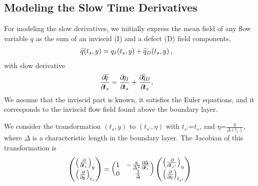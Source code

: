 {%
\subsection{Modeling the Slow Time Derivatives}

For modeling the slow derivatives, we initially express the mean field of any
flow variable $q$ as the sum of an inviscid (I) and a defect (D) field
components,
%
\begin{align}
\label{eqn:similarDecomposition}
\widetilde{q} \! \left(t_s, y\right) &=
     q_I \! \left(t_s, y\right)
   + \widetilde{q}_D \! \left(t_s, y\right)
   ,
\end{align}
%
with slow derivative
\begin{align}
\label{eqn:similarDecompositionSlow}
\frac{\partial\!{\widetilde{q}}}{\partial\!{t_s}} &=
     \frac{\partial\!{q_I}}{\partial\!{t_s}}
   + \frac{\partial\!{\widetilde{q}_D}}{\partial\!{t_s}}
   ,
\end{align}
We assume that the inviscid part is known, it satisfies the Euler equations, and
it corresponds to the inviscid flow field found above the boundary layer.
%

We consider the transformation $(t_s,y)$ to $(t_{s'}, \eta)$ with
$t_{s'}$=$t_s$, and $\eta$=$\frac{y}{\Delta(t_s)}$,
where $\Delta$ is a characteristic length in the boundary layer.
The Jacobian of this transformation is
%
\begin{equation}
\begin{pmatrix}
\left(\pp{}{t_s}\right)_y\\
\left(\pp{}{y}\right)_{t_s}\\
\end{pmatrix}
=
\begin{pmatrix}
1 & -\frac{y}{\Delta^2} \pp{\Delta}{t_s}\\
0 & \frac{1}{\Delta}\\
\end{pmatrix}
\begin{pmatrix}
\left(\pp{}{t_{s'}}\right)_\eta\\
\left(\pp{}{\eta}\right)_{t_{s'}}\\
\end{pmatrix}
\end{equation}
%

}
